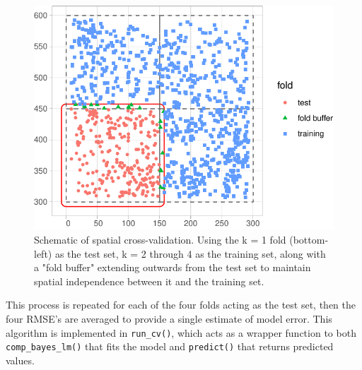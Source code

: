 \documentclass[12pt]{article}
\newenvironment{Shaded}{\begin{snugshade}}{\end{snugshade}}
\newcommand{\CommentTok}[1]{\textcolor[rgb]{0.56,0.35,0.01}{\textit{#1}}}
\newcommand{\DataTypeTok}[1]{\textcolor[rgb]{0.13,0.29,0.53}{#1}}
\newcommand{\KeywordTok}[1]{\textcolor[rgb]{0.13,0.29,0.53}{\textbf{#1}}}
\newcommand{\NormalTok}[1]{#1}
\newcommand{\OperatorTok}[1]{\textcolor[rgb]{0.81,0.36,0.00}{\textbf{#1}}}
\newcommand{\StringTok}[1]{\textcolor[rgb]{0.31,0.60,0.02}{#1}}
\begin{document}
\begin{figure}

{\centering \includegraphics[width=0.66\linewidth]{Figures/scbi-spatial-cross-validation-schematic-1} 

}

\caption{Schematic of spatial cross-validation. Using the k = 1 fold (bottom-left) as the test set, k = 2 through 4 as the training set, along with a "fold buffer" extending outwards from the test set to maintain spatial independence between it and the training set.}\label{fig:scbi-spatial-cross-validation-schematic}
\end{figure}

This process is repeated for each of the four folds acting as the test
set, then the four RMSE's are averaged to provide a single estimate of
model error. This algorithm is implemented in \texttt{run\_cv()}, which
acts as a wrapper function to both \texttt{comp\_bayes\_lm()} that fits
the model and \texttt{predict()} that returns predicted values.

\begin{Shaded}
\end{Shaded}

\begin{Shaded}
\end{Shaded}
\end{document}
